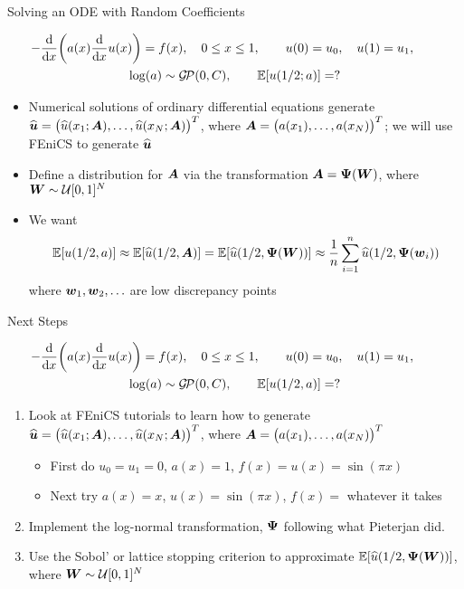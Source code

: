 \documentclass[11pt,compress,xcolor={usenames,dvipsnames},aspectratio=169]{beamer}
\DeclareMathOperator{\GP}{\mathcal{G} \! \mathcal{P}}
\newcommand{\hvu}{\widehat{\vu}}
\newcommand{\hu}{\widehat{u}}
\begin{document}
\begin{frame}{Solving an ODE with Random Coefficients}

\vspace{-8ex}
\begin{gather*}
-\frac{\dif }{\dif x}\biggl(a(x) \frac{\dif}{\dif x} u(x) \biggr) = f(x), \quad 0 \leq x \leq 1, \qquad
u(0) = u_0, \quad
u(1) = u_1, \qquad \\
\log(a) \sim \GP(0,C), \qquad \Ex[u(1/2;a)] = ?
\end{gather*}

\vspace{-3ex}
\begin{itemize}
    \item Numerical solutions of ordinary differential equations generate $\hvu = \bigl(\hu(x_1;\vA), \ldots, \hu(x_N;\vA)\bigr)^T$, where $\boldsymbol{A} = \bigl( a(x_1), \dots, a(x_N) \bigr)^T$; we will use FEniCS to generate $\hvu$
    \item  Define a distribution for $\boldsymbol{A}$ via the transformation $\boldsymbol{A} = \boldsymbol{\Psi}(\boldsymbol{W})$, where $\boldsymbol{W} \sim \mathcal{U}[0,1]^N$
    \item We want 
    \[
    \Ex[u(1/2,a)] \approx \Ex[\hu(1/2,\vA)] = \Ex[\hu(1/2,\vPsi(\vW))] \approx \frac 1n \sum_{i=1}^n \hu(1/2,\vPsi(\vw_i))
    \]
    where $\boldsymbol{w}_1, \boldsymbol{w}_2, \ldots$ are low discrepancy points
    
\end{itemize}

    
\end{frame}


\begin{frame}{Next Steps}

\vspace{-8ex}
\begin{gather*}
-\frac{\dif }{\dif x}\biggl(a(x) \frac{\dif}{\dif x} u(x) \biggr) = f(x), \quad 0 \leq x \leq 1, \qquad
u(0) = u_0, \quad
u(1) = u_1, \qquad \\
\log(a) \sim \GP(0,C), \qquad \Ex[u(1/2,a)] = ?
\end{gather*}

\vspace{-3ex}
\begin{enumerate}
    \item Look at FEniCS tutorials to learn how to generate $\hvu = \bigl(\hu(x_1;\vA), \ldots, \hu(x_N;\vA)\bigr)^T$, where $\boldsymbol{A} = \bigl( a(x_1), \dots, a(x_N) \bigr)^T$
    \begin{itemize}
        \item First do $u_0 = u_1 = 0$, $a(x) = 1$, $f(x) = u(x) = \sin(\pi x)$
        \item Next try $a(x) = x$, $u(x) = \sin (\pi x)$, $f(x) =$ whatever it takes
    \end{itemize}
    \item  Implement the log-normal transformation, $\boldsymbol{\Psi}$ following what Pieterjan did.
    \item Use the Sobol' or lattice stopping criterion to approximate  $\Ex[\hu(1/2,\vPsi(\vW))]$, where $\boldsymbol{W} \sim \mathcal{U}[0,1]^N$
    
\end{enumerate}

    
\end{frame}
\end{document}

